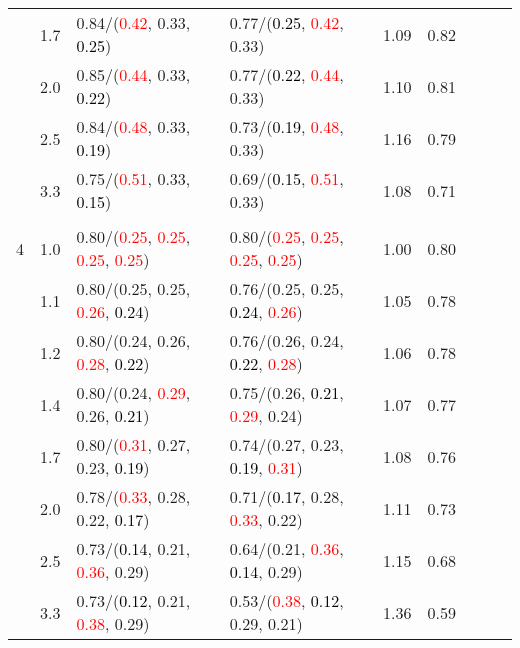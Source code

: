 \documentclass[10pt,a4paper]{report}
\begin{document}
\begin{table}[!htbp]
\begin{center}
{\begin{tabular}{ccllccccc}
			&1.7&0.84/(\textcolor{red}{0.42}, 0.33, \textcolor{black}{0.25})&0.77/(\textcolor{black}{0.25}, \textcolor{red}{0.42}, 0.33)&1.09&0.82\\
			&2.0&0.85/(\textcolor{red}{0.44}, 0.33, \textcolor{black}{0.22})&0.77/(\textcolor{black}{0.22}, \textcolor{red}{0.44}, 0.33)&1.10&0.81\\
			&2.5&0.84/(\textcolor{red}{0.48}, 0.33, \textcolor{black}{0.19})&0.73/(\textcolor{black}{0.19}, \textcolor{red}{0.48}, 0.33)&1.16&0.79\\
			&3.3&0.75/(\textcolor{red}{0.51}, 0.33, \textcolor{black}{0.15})&0.69/(\textcolor{black}{0.15}, \textcolor{red}{0.51}, 0.33)&1.08&0.71\\
			&&&&\\
			4			&1.0&0.80/(\textcolor{red}{0.25}, \textcolor{red}{0.25}, \textcolor{red}{0.25}, \textcolor{red}{0.25})&0.80/(\textcolor{red}{0.25}, \textcolor{red}{0.25}, \textcolor{red}{0.25}, \textcolor{red}{0.25})&1.00&0.80\\
			&1.1&0.80/(0.25, 0.25, \textcolor{red}{0.26}, \textcolor{black}{0.24})&0.76/(0.25, 0.25, \textcolor{black}{0.24}, \textcolor{red}{0.26})&1.05&0.78\\
			&1.2&0.80/(0.24, 0.26, \textcolor{red}{0.28}, \textcolor{black}{0.22})&0.76/(0.26, 0.24, \textcolor{black}{0.22}, \textcolor{red}{0.28})&1.06&0.78\\
			&1.4&0.80/(0.24, \textcolor{red}{0.29}, 0.26, \textcolor{black}{0.21})&0.75/(0.26, \textcolor{black}{0.21}, \textcolor{red}{0.29}, 0.24)&1.07&0.77\\
			&1.7&0.80/(\textcolor{red}{0.31}, 0.27, 0.23, \textcolor{black}{0.19})&0.74/(0.27, 0.23, \textcolor{black}{0.19}, \textcolor{red}{0.31})&1.08&0.76\\
			&2.0&0.78/(\textcolor{red}{0.33}, 0.28, 0.22, \textcolor{black}{0.17})&0.71/(\textcolor{black}{0.17}, 0.28, \textcolor{red}{0.33}, 0.22)&1.11&0.73\\
			&2.5&0.73/(\textcolor{black}{0.14}, 0.21, \textcolor{red}{0.36}, 0.29)&0.64/(0.21, \textcolor{red}{0.36}, \textcolor{black}{0.14}, 0.29)&1.15&0.68\\
			&3.3&0.73/(\textcolor{black}{0.12}, 0.21, \textcolor{red}{0.38}, 0.29)&0.53/(\textcolor{red}{0.38}, \textcolor{black}{0.12}, 0.29, 0.21)&1.36&0.59\\
			\bottomrule
		\end{tabular}}
	\end{center}
\end{table}
\end{document}
